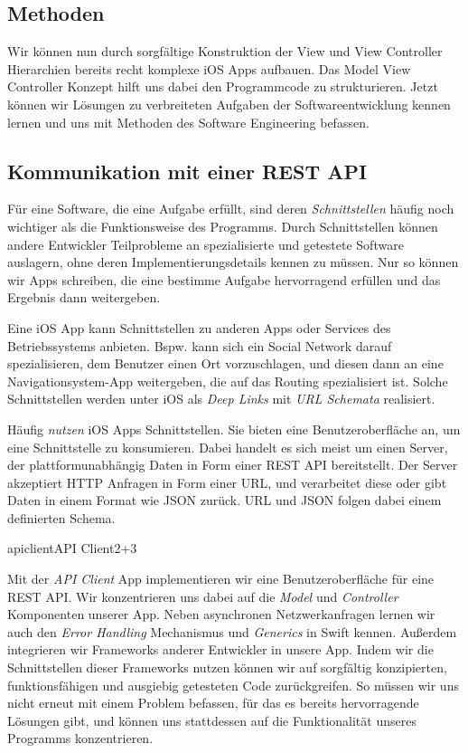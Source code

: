 \documentclass[parskip=half, final]{scrreprt}
\begin{document}
\begin{lecture} %


\chapter{Methoden}

Wir können nun durch sorgfältige Konstruktion der View und View Controller Hierarchien bereits recht komplexe iOS Apps aufbauen. Das Model View Controller Konzept hilft uns dabei den Programmcode zu strukturieren. Jetzt können wir Lösungen zu verbreiteten Aufgaben der Softwareentwicklung kennen lernen und uns mit Methoden des Software Engineering befassen.

\section{Kommunikation mit einer REST API}

Für eine Software, die eine Aufgabe erfüllt, sind deren \emph{Schnittstellen} häufig noch wichtiger als die Funktionsweise des Programms. Durch Schnittstellen können andere Entwickler Teilprobleme an spezialisierte und getestete Software auslagern, ohne deren Implementierungsdetails kennen zu müssen. Nur so können wir Apps schreiben, die eine bestimme Aufgabe hervorragend erfüllen und das Ergebnis dann weitergeben.

Eine iOS App kann Schnittstellen zu anderen Apps oder Services des Betriebssystems anbieten. Bspw. kann sich ein Social Network darauf spezialisieren, dem Benutzer einen Ort vorzuschlagen, und diesen dann an eine Navigationsystem-App weitergeben, die auf das Routing spezialisiert ist. Solche Schnittstellen werden unter iOS als \emph{Deep Links} mit \emph{URL Schemata} realisiert.

Häufig \emph{nutzen} iOS Apps Schnittstellen. Sie bieten eine Benutzeroberfläche an, um eine Schnittstelle zu konsumieren. Dabei handelt es sich meist um einen Server, der plattformunabhängig Daten in Form einer REST API bereitstellt. Der Server akzeptiert HTTP Anfragen in Form einer URL, und verarbeitet diese oder gibt Daten in einem Format wie JSON zurück. URL und JSON folgen dabei einem definierten Schema.

\begin{exc}

\begin{excitem}{apiclient}{API Client}{2+3}

Mit der \emph{API Client} App implementieren wir eine Benutzeroberfläche für eine REST API. Wir konzentrieren uns dabei auf die \mvcindicatormodel\emph{Model} und \emph{Controller} Komponenten unserer App. Neben asynchronen Netzwerkanfragen lernen wir auch den \emph{Error Handling} Mechanismus und \emph{Generics} in Swift kennen. Außerdem integrieren wir Frameworks anderer Entwickler in unsere App. Indem wir die Schnittstellen dieser Frameworks nutzen können wir auf sorgfältig konzipierten, funktionsfähigen und ausgiebig getesteten Code zurückgreifen. So müssen wir uns nicht erneut mit einem Problem befassen, für das es bereits hervorragende Lösungen gibt, und können uns stattdessen auf die Funktionalität unseres Programms konzentrieren.


\end{excitem}
\end{exc}
\end{lecture}
\end{document}

